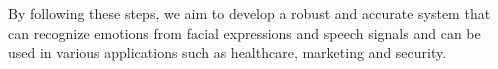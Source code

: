 \noindent By following these steps, we aim to develop a robust and accurate system that can recognize emotions from facial expressions and speech signals and can be used in various applications such as healthcare, marketing and security.



%
%